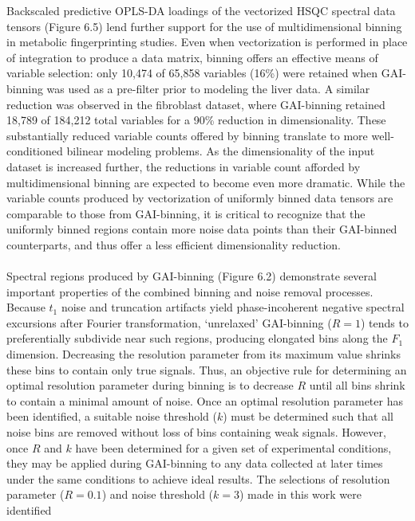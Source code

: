 \begin{doublespace}
Backscaled predictive OPLS-DA loadings of the vectorized \hcnmr HSQC spectral
data tensors (Figure 6.5) lend further support for the use of multidimensional
binning in metabolic fingerprinting studies. Even when vectorization is
performed in place of integration to produce a data matrix, binning offers an
effective means of variable selection: only 10,474 of 65,858 variables (16\%)
were retained when GAI-binning was used as a pre-filter prior to modeling the
liver data. A similar reduction was observed in the fibroblast dataset, where
GAI-binning retained 18,789 of 184,212 total variables for a 90\% reduction in
dimensionality. These substantially reduced variable counts offered by binning
translate to more well-conditioned bilinear modeling problems. As the
dimensionality of the input dataset is increased further, the reductions in
variable count afforded by multidimensional binning are expected to become even
more dramatic. While the variable counts produced by vectorization of uniformly
binned data tensors are comparable to those from GAI-binning, it is critical to
recognize that the uniformly binned regions contain more noise data points than
their GAI-binned counterparts, and thus offer a less efficient dimensionality
reduction.
\\\\
Spectral regions produced by GAI-binning (Figure 6.2) demonstrate several
important properties of the combined binning and noise removal processes.
Because $t_1$ noise and truncation artifacts yield phase-incoherent negative
spectral excursions after Fourier transformation, `unrelaxed' GAI-binning
($R = 1$) tends to preferentially subdivide near such regions, producing
elongated bins along the $F_1$ dimension. Decreasing the resolution parameter
from its maximum value shrinks these bins to contain only true signals. Thus,
an objective rule for determining an optimal resolution parameter during
binning is to decrease $R$ until all bins shrink to contain a minimal amount
of noise. Once an optimal resolution parameter has been identified, a suitable
noise threshold ($k$) must be determined such that all noise bins are removed
without loss of bins containing weak signals. However, once $R$ and $k$ have
been determined for a given set of experimental conditions, they may be applied
during GAI-binning to any data collected at later times under the same
conditions to achieve ideal results. The selections of resolution parameter
($R = 0.1$) and noise threshold ($k = 3$) made in this work were identified

\end{doublespace}
